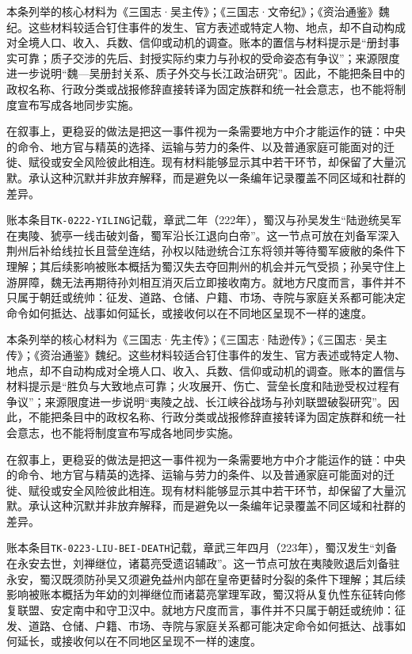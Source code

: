 本条列举的核心材料为《三国志·吴主传》；《三国志·文帝纪》；《资治通鉴》魏纪。这些材料较适合钉住事件的发生、官方表述或特定人物、地点，却不自动构成对全境人口、收入、兵数、信仰或动机的调查。账本的置信与材料提示是“册封事实可靠；质子交涉的先后、封授实际约束力与孙权的受命姿态有争议”；来源限度进一步说明“魏—吴册封关系、质子外交与长江政治研究”。因此，不能把条目中的政权名称、行政分类或战报修辞直接转译为固定族群和统一社会意志，也不能将制度宣布写成各地同步实施。

在叙事上，更稳妥的做法是把这一事件视为一条需要地方中介才能运作的链：中央的命令、地方官与精英的选择、运输与劳力的条件、以及普通家庭可能面对的迁徙、赋役或安全风险彼此相连。现有材料能够显示其中若干环节，却保留了大量沉默。承认这种沉默并非放弃解释，而是避免以一条编年记录覆盖不同区域和社群的差异。

账本条目\texttt{TK-0222-YILING}记载，章武二年（222年），蜀汉与孙吴发生“陆逊统吴军在夷陵、猇亭一线击破刘备，蜀军沿长江退向白帝”。这一节点可放在刘备军深入荆州后补给线拉长且营垒连结，孙权以陆逊统合江东将领并等待蜀军疲敝的条件下理解；其后续影响被账本概括为蜀汉失去夺回荆州的机会并元气受损；孙吴守住上游屏障，魏无法再期待孙刘相互消灭后立即接收南方。就地方尺度而言，事件并不只属于朝廷或统帅：征发、道路、仓储、户籍、市场、寺院与家庭关系都可能决定命令如何抵达、战事如何延长，或接收何以在不同地区呈现不一样的速度。

本条列举的核心材料为《三国志·先主传》；《三国志·陆逊传》；《三国志·吴主传》；《资治通鉴》魏纪。这些材料较适合钉住事件的发生、官方表述或特定人物、地点，却不自动构成对全境人口、收入、兵数、信仰或动机的调查。账本的置信与材料提示是“胜负与大致地点可靠；火攻展开、伤亡、营垒长度和陆逊受权过程有争议”；来源限度进一步说明“夷陵之战、长江峡谷战场与孙刘联盟破裂研究”。因此，不能把条目中的政权名称、行政分类或战报修辞直接转译为固定族群和统一社会意志，也不能将制度宣布写成各地同步实施。

在叙事上，更稳妥的做法是把这一事件视为一条需要地方中介才能运作的链：中央的命令、地方官与精英的选择、运输与劳力的条件、以及普通家庭可能面对的迁徙、赋役或安全风险彼此相连。现有材料能够显示其中若干环节，却保留了大量沉默。承认这种沉默并非放弃解释，而是避免以一条编年记录覆盖不同区域和社群的差异。

账本条目\texttt{TK-0223-LIU-BEI-DEATH}记载，章武三年四月（223年），蜀汉发生“刘备在永安去世，刘禅继位，诸葛亮受遗诏辅政”。这一节点可放在夷陵败退后刘备驻永安，蜀汉既须防孙吴又须避免益州内部在皇帝更替时分裂的条件下理解；其后续影响被账本概括为年幼的刘禅继位而诸葛亮掌理军政，蜀汉将从复仇性东征转向修复联盟、安定南中和守卫汉中。就地方尺度而言，事件并不只属于朝廷或统帅：征发、道路、仓储、户籍、市场、寺院与家庭关系都可能决定命令如何抵达、战事如何延长，或接收何以在不同地区呈现不一样的速度。

